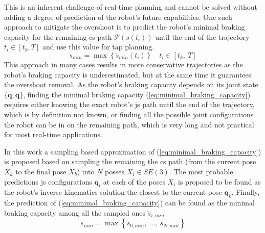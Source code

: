 This is an inherent challenge of real-time planning and cannot be solved without adding a degree of prediction of the robot's future capabilities. One such approach to mitigate the overshoot is to predict the robot's minimal braking capacity for the remaining \gls{cs} path $\mathscr{P}(s(t_i))$ until the end of the trajectory $ t_i \in \left[t_k, T\right]$ and use this value for \gls{tap} planning.
\begin{equation}
    \ddot{s}_{min} = \max \left\{\ddot{s}_{min}(t_i)\right\} \quad t_i \in \left[t_k ,~ T\right]
\label{eq:minimal_braking_capacity}
\end{equation}
This approach in many cases results in more conservative trajectories as the robot's braking capacity is underestimated, but at the same time it guarantees the overshoot removal. As the robot's braking capacity depends on its joint state $\{\bm{q},\dot{\bm{q}}\}$, finding the minimal braking capacity (\ref{eq:minimal_braking_capacity}) requires either knowing the exact robot's \gls{js} path until the end of the trajectory, which is by definition not known, or finding all the possible joint configurations the robot can be in on the remaining path, which is very long and not practical for most real-time applications.

In this work a sampling based approximation of (\ref{eq:minimal_braking_capacity}) is proposed based on sampling the remaining the \gls{cs} path (from the current pose $X_k$ to the final pose $X_b$) into $N$ posses $X_i\in SE(3)$. The most probable predictions \gls{js} configurations $\bm{q}_i$ at each of the poses $X_i$ is proposed to be found as the robot's inverse kinematics solution the closest to the current pose $\bm{q}_k$. Finally, the prediction of (\ref{eq:minimal_braking_capacity}) can be found as the minimal braking capacity among all the sampled ones $\ddot{s}_{i, min}$
\begin{equation}
    \ddot{s}_{min} = \max \left\{\ddot{s}_{0, min},~ \ldots,~ \ddot{s}_{N, min}\right \}
\end{equation}



